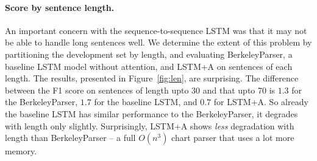 \documentclass{article} \usepackage{nips15submit_e,times}
\begin{document}
\paragraph{Score by sentence length.}
An important concern with the sequence-to-sequence LSTM was that it may not
be able to handle long sentences well.  We determine the extent of this problem
by partitioning the development set by length, and evaluating BerkeleyParser,
a baseline LSTM model without attention, and LSTM+A on sentences of each length.
The results, presented in Figure~\ref{fig:len}, are surprising. The difference
between the F1 score on sentences of length upto 30 and that upto 70 is $1.3$
for the BerkeleyParser, $1.7$ for the baseline LSTM, and $0.7$ for LSTM+A.
So already the baseline LSTM has similar performance to the BerkeleyParser,
it degrades with length only slightly. Surprisingly, LSTM+A shows \emph{less}
degradation with length than BerkeleyParser -- a full $O(n^3)$ chart parser
that uses a lot more memory.
\end{document}
